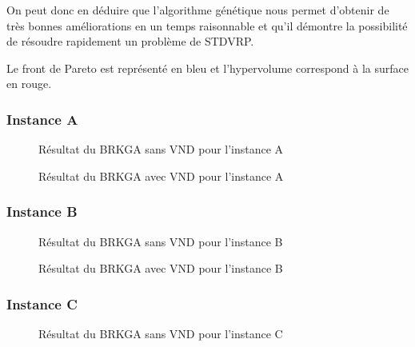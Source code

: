             On peut donc en déduire que l'algorithme génétique nous permet d'obtenir de très bonnes améliorations en un temps raisonnable et qu'il démontre la possibilité de résoudre rapidement un problème de STDVRP.

            Le front de Pareto est représenté en bleu et l'hypervolume correspond à la surface en rouge.
            
            \subsubsection{Instance A}
                
                \begin{figure}[H]
                	
                \caption{Résultat du BRKGA sans VND pour l'instance A}
				\label{fig:10m2i2d-sansvnd}
				\end{figure}
                
                \begin{figure}[H]
                	
                \caption{Résultat du BRKGA avec VND pour l'instance A}
				\label{fig:10m2i2d-avecvnd}
				\end{figure}
				
            \subsubsection{Instance B}
                \begin{figure}[H]
                	
                \caption{Résultat du BRKGA sans VND pour l'instance B}
				\label{fig:20m3i3d-sansvnd}
				\end{figure}
                
                \begin{figure}[H]
                	
                \caption{Résultat du BRKGA avec VND pour l'instance B}
				\label{fig:20m3i3d-avecvnd}
				\end{figure}
				
            \subsubsection{Instance C}
           		\begin{figure}[H]
                	
                \caption{Résultat du BRKGA sans VND pour l'instance C}
				\label{fig:30m4i3d-sansvnd}
                \end{figure}
                
